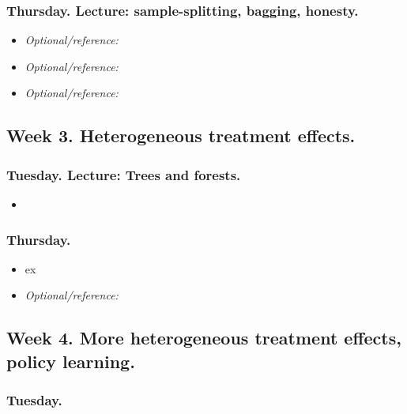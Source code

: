 \documentclass[letterpaper, 12pt, parskip=full,DIV=10]{scrartcl}
\begin{document}
\subsubsection*{Thursday. Lecture: sample-splitting, bagging, honesty.}

\begin{itemize}
\item  \textit{Optional/reference:}  
\item  \textit{Optional/reference:}  
\item \textit{Optional/reference:}  
\end{itemize}


\subsection*{Week 3. Heterogeneous treatment effects.}

\subsubsection*{Tuesday. Lecture: Trees and forests.}%

\begin{itemize}
\item {}
\end{itemize}




\subsubsection*{Thursday.}

\begin{itemize}
\item {} ex
\item  \textit{Optional/reference:} 
\end{itemize}

\subsection*{Week 4. More heterogeneous treatment effects, policy learning.}

\subsubsection*{Tuesday.}
\end{document}
